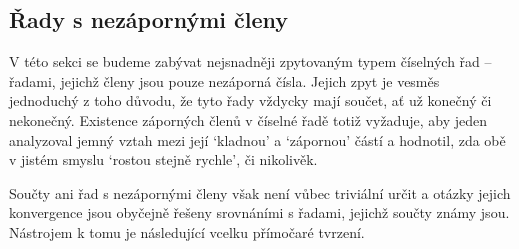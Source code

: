 \subsection{Řady s nezápornými členy}
\label{ssec:rady-s-nezapornymi-cleny}

V této sekci se budeme zabývat nejsnadněji zpytovaným typem číselných řad --
řadami, jejichž členy jsou pouze nezáporná čísla. Jejich zpyt je vesměs
jednoduchý z toho důvodu, že tyto řady vždycky mají součet, ať už konečný či
nekonečný. Existence záporných členů v číselné řadě totiž vyžaduje, aby jeden
analyzoval jemný vztah mezi její `kladnou' a `zápornou' částí a hodnotil, zda
obě v jistém smyslu `rostou stejně rychle', či nikolivěk.

Součty ani řad s nezápornými členy však není vůbec triviální určit a otázky
jejich konvergence jsou obyčejně řešeny srovnáními s řadami, jejichž součty
známy jsou. Nástrojem k tomu je následující vcelku přímočaré tvrzení.

